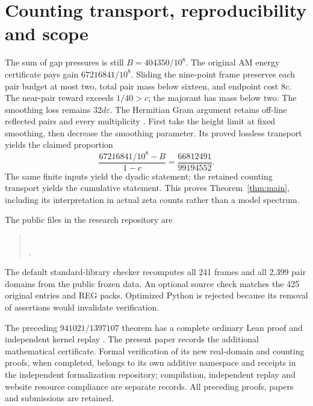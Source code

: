 \documentclass[11pt,a4paper]{article}
\begin{document}
\section{Counting transport, reproducibility and scope}

The sum of gap pressures is still $B=404350/10^8$. The original
AM energy certificate pays gain $67216841/10^8$. Sliding the
nine-point frame preserves each pair budget at most two, total
pair mass below sixteen, and endpoint cost $8c$. The near-pair
reward exceeds $1/40>c$; the majorant has mass below two.
The smoothing loss remains $32d\varepsilon$. The Hermitian Gram
argument retains off-line reflected pairs and every multiplicity
\cite{Ninth,Lossless}. First take the height limit at fixed smoothing,
then decrease the smoothing parameter. Its proved lossless
transport yields the claimed proportion
\[
 \frac{67216841/10^8-B}{1-c}
 =\frac{66812491}{99194552}.
\]
The same finite inputs yield the dyadic statement; the retained
counting transport yields the cumulative statement. This proves
Theorem~\ref{thm:main}, including its interpretation in actual zeta
counts rather than a model spectrum.

The public files in the research repository are
\begin{quote}\small
{}\\
.
\end{quote}
The default standard-library checker recomputes all
241 frames and all 2,399 pair domains from the public frozen data.
An optional source check matches the 425 original entries and REG
packs. Optimized Python is rejected because its removal of
assertions would invalidate verification.

The preceding $941021/1397107$ theorem has a complete ordinary Lean
proof and independent kernel replay \cite{Formal}. The present paper
records the additional mathematical certificate. Formal verification
of its new real-domain and counting proofs, when completed, belongs
to its own additive namespace and receipts in the independent
formalization repository; compilation, independent replay and
website resource compliance are separate records. All preceding
proofs, papers and submissions are retained.
\end{document}
